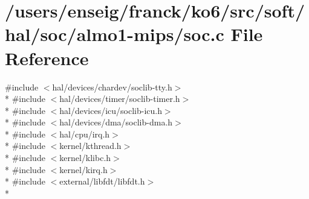 \hypertarget{almo1-mips_2soc_8c}{\section{/users/enseig/franck/ko6/src/soft/hal/soc/almo1-\/mips/soc.c File Reference}
\label{almo1-mips_2soc_8c}
}
{\ttfamily \#include $<$hal/devices/chardev/soclib-\/tty.\-h$>$}\\*
{\ttfamily \#include $<$hal/devices/timer/soclib-\/timer.\-h$>$}\\*
{\ttfamily \#include $<$hal/devices/icu/soclib-\/icu.\-h$>$}\\*
{\ttfamily \#include $<$hal/devices/dma/soclib-\/dma.\-h$>$}\\*
{\ttfamily \#include $<$hal/cpu/irq.\-h$>$}\\*
{\ttfamily \#include $<$kernel/kthread.\-h$>$}\\*
{\ttfamily \#include $<$kernel/klibc.\-h$>$}\\*
{\ttfamily \#include $<$kernel/kirq.\-h$>$}\\*
{\ttfamily \#include $<$external/libfdt/libfdt.\-h$>$}\\*
